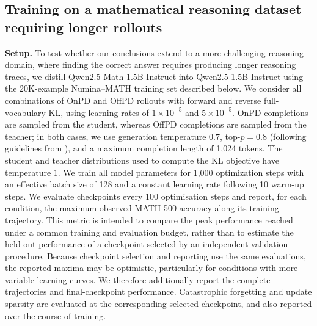 \documentclass{article} %
\theoremstyle{plain}
\theoremstyle{definition}
\theoremstyle{remark}
\begin{document}
\clearpage
\subsection{Training on a mathematical reasoning dataset requiring longer rollouts}
\label{app:math_qwen}

\textbf{Setup.}
To test whether our conclusions extend to a more challenging reasoning domain, where finding the correct answer requires producing longer reasoning traces, we distill Qwen2.5-Math-1.5B-Instruct \citep{yang2024qwen25mathtechnicalreportmathematical} into Qwen2.5-1.5B-Instruct using the 20K-example Numina--MATH training set described below. We consider all combinations of OnPD and OffPD rollouts with forward and reverse full-vocabulary KL, using learning rates of $1\times10^{-5}$ and $5\times10^{-5}$. OnPD completions are sampled from the student, whereas OffPD completions are sampled from the teacher; in both cases, we use generation temperature $0.7$, top-$p=0.8$ (following guidelines from \citet{yang2024qwen25mathtechnicalreportmathematical}), and a maximum completion length of 1,024 tokens. The student and teacher distributions used to compute the KL objective have temperature $1$. We train all model parameters for 1,000 optimization steps with an effective batch size of 128 and a constant learning rate following 10 warm-up steps. We evaluate checkpoints every 100 optimisation steps and report, for each condition, the maximum observed MATH-500 accuracy along its training trajectory. This metric is intended to compare the peak performance reached under a common training and evaluation budget, rather than to estimate the held-out performance of a checkpoint selected by an independent validation procedure. Because checkpoint selection and reporting use the same evaluations, the reported maxima may be optimistic, particularly for conditions with more variable learning curves. We therefore additionally report the complete trajectories and final-checkpoint performance. Catastrophic forgetting and update sparsity are evaluated at the corresponding selected checkpoint, and also reported over the course of training.
\end{document}
